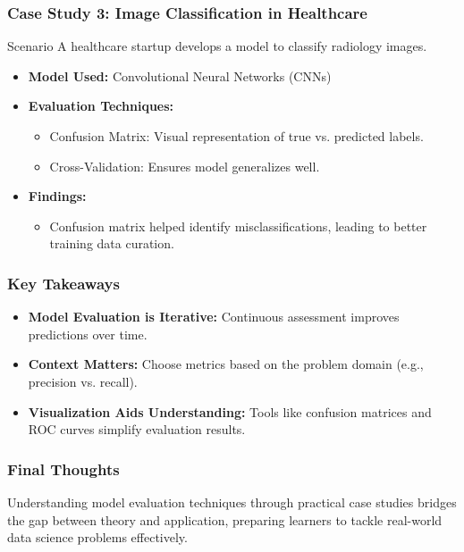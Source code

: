 \documentclass[aspectratio=169]{beamer}
\begin{document}
\begin{frame}[fragile]
    \frametitle{Case Study 3: Image Classification in Healthcare}
    \begin{block}{Scenario}
        A healthcare startup develops a model to classify radiology images.
    \end{block}
    \begin{itemize}
        \item \textbf{Model Used:} Convolutional Neural Networks (CNNs)
        \item \textbf{Evaluation Techniques:}
        \begin{itemize}
            \item Confusion Matrix: Visual representation of true vs. predicted labels.
            \item Cross-Validation: Ensures model generalizes well.
        \end{itemize}
        \item \textbf{Findings:}
        \begin{itemize}
            \item Confusion matrix helped identify misclassifications, leading to better training data curation.
        \end{itemize}
    \end{itemize}
\end{frame}

\begin{frame}[fragile]
    \frametitle{Key Takeaways}
    \begin{itemize}
        \item \textbf{Model Evaluation is Iterative:} Continuous assessment improves predictions over time.
        \item \textbf{Context Matters:} Choose metrics based on the problem domain (e.g., precision vs. recall).
        \item \textbf{Visualization Aids Understanding:} Tools like confusion matrices and ROC curves simplify evaluation results.
    \end{itemize}
\end{frame}

\begin{frame}[fragile]
    \frametitle{Final Thoughts}
    Understanding model evaluation techniques through practical case studies bridges the gap between theory and application, preparing learners to tackle real-world data science problems effectively.
\end{frame}
\end{document}
